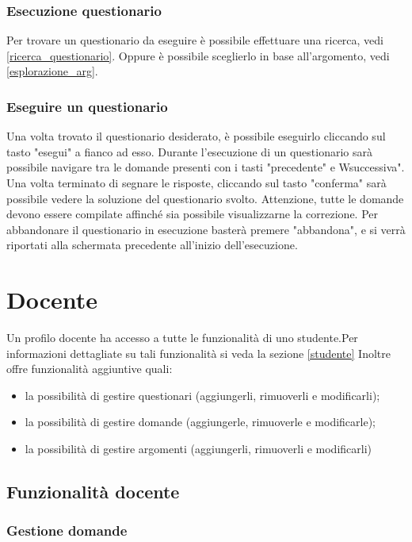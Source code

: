 \documentclass[12pt,a4paper]{article}
\begin{document}
	\subsubsection{Esecuzione questionario}
	Per trovare un questionario da eseguire è possibile effettuare una ricerca, vedi \ref{ricerca_questionario}.
	Oppure è possibile sceglierlo in base all'argomento, vedi \ref{esplorazione_arg}.
	\subsubsection{Eseguire un questionario}
	Una  volta trovato il questionario desiderato, è possibile eseguirlo cliccando sul tasto "esegui" a fianco ad esso.
	Durante l'esecuzione di un questionario sarà possibile navigare tra le domande presenti con i tasti "precedente" e Wsuccessiva".
	Una volta terminato di segnare le risposte, cliccando sul tasto "conferma" sarà possibile vedere la soluzione del questionario svolto.
	Attenzione, tutte le domande devono essere compilate affinché sia possibile visualizzarne la correzione.
	Per abbandonare il questionario in esecuzione basterà premere "abbandona", e si verrà riportati alla schermata precedente all'inizio dell'esecuzione.
	
	\section{Docente}\label{docente}
	Un profilo docente ha accesso a tutte le funzionalità di uno studente.Per informazioni dettagliate su tali funzionalità si veda la sezione \ref{studente}
		Inoltre offre funzionalità aggiuntive quali:
		\begin{itemize}
			\item la possibilità di gestire questionari (aggiungerli, rimuoverli e modificarli);
			\item la possibilità di gestire domande (aggiungerle, rimuoverle e modificarle);
			\item la possibilità di gestire argomenti (aggiungerli, rimuoverli e modificarli)
		\end{itemize}
	\subsection{Funzionalità docente}
	
    \subsubsection{Gestione domande}
\end{document}
